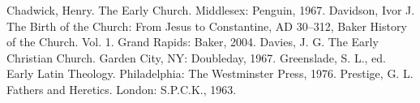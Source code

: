 \begin{readinglist}
\entry Chadwick, Henry. The Early Church. Middlesex: Penguin, 1967.
\entry Davidson, Ivor J. The Birth of the Church: From Jesus to Constantine, AD 30–312, Baker
  History of the Church. Vol. 1. Grand Rapids: Baker, 2004.
\entry Davies, J. G. The Early Christian Church. Garden City, NY: Doubleday, 1967.
\entry Greenslade, S. L., ed. Early Latin Theology. Philadelphia: The Westminster Press, 1976.
\entry Prestige, G. L. Fathers and Heretics. London: S.P.C.K., 1963.
\end{readinglist}
